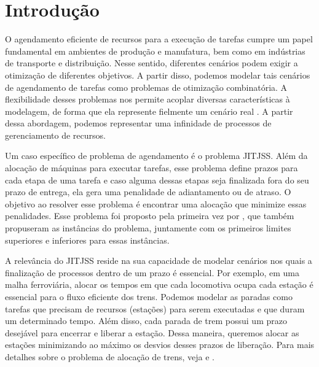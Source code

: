 ﻿\chapter{Introdução} \label{cap:intro}

 O agendamento eficiente de recursos para a execução de tarefas cumpre um papel fundamental em ambientes de produção e manufatura, bem como em indústrias de transporte e distribuição. Nesse sentido, diferentes cenários podem exigir a otimização de diferentes objetivos. A partir disso, podemos modelar tais cenários de agendamento de tarefas como problemas de otimização combinatória. A flexibilidade desses problemas nos permite acoplar diversas características à modelagem, de forma que ela represente fielmente um cenário real \citep{pinedo2008}. A partir dessa abordagem, podemos representar uma infinidade de processos de gerenciamento de recursos.


 Um caso específico de problema de agendamento é o problema \ac{JITJSS}. Além da alocação de máquinas para executar tarefas, esse problema define prazos para cada etapa de uma tarefa e caso alguma dessas etapas seja finalizada fora do seu prazo de entrega, ela gera uma penalidade de adiantamento ou de atraso. O objetivo ao resolver esse problema é encontrar uma alocação que minimize essas penalidades. Esse problema foi proposto pela primeira vez por \cite{baptiste2008lagrangian}, que também propuseram as instâncias do problema, juntamente com os primeiros limites superiores e inferiores para essas instâncias.

A relevância do \ac{JITJSS} reside na sua capacidade de modelar cenários nos quais a finalização de processos dentro de um prazo é essencial. Por exemplo, em uma malha ferroviária, alocar os tempos em que cada locomotiva ocupa cada estação é essencial para o fluxo eficiente dos trens. Podemos modelar as paradas como tarefas que precisam de recursos (estações) para serem executadas e que duram um determinado tempo. Além disso, cada parada de trem possui um prazo desejável para encerrar e liberar a estação. Dessa maneira, queremos alocar as estações minimizando ao máximo os desvios desses prazos de liberação. Para mais detalhes sobre o problema de alocação de trens, veja \cite{liu2011scheduling} e \cite{flamini2008real}.

